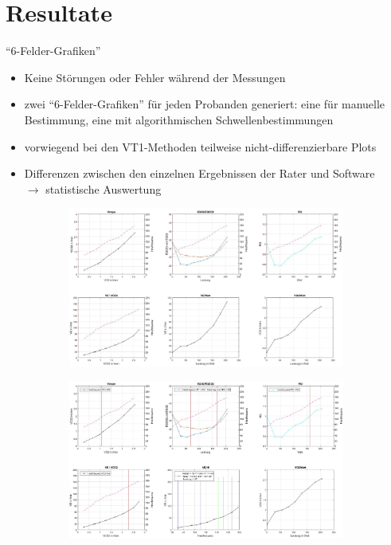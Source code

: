 \documentclass[colorBG,slideColor,8pt]{beamer}
\begin{document}
\section{Resultate}

\begin{frame}{"`6-Felder-Grafiken"'}
	\begin{itemize}
		\item Keine Störungen oder Fehler während der Messungen
		\item zwei "`6-Felder-Grafiken"' für jeden Probanden generiert: eine für manuelle Bestimmung, eine mit algorithmischen Schwellenbestimmungen
		\item vorwiegend bei den VT1-Methoden teilweise nicht-differenzierbare Plots
		\item Differenzen zwischen den einzelnen Ergebnissen der Rater und Software\\$\rightarrow$ statistische Auswertung
	\end{itemize}
	\begin{figure}[H]
		\begin{subfigure}[c]{0.45\linewidth}
			\centering
			\includegraphics[width=\linewidth]{Bilder/plot_6w.jpg}
		\end{subfigure}
		\hfil
		\begin{subfigure}[c]{0.45\linewidth}
			\centering
			\includegraphics[width=\linewidth]{Bilder/auto_6.png}
		\end{subfigure}
	\end{figure}
\end{frame}
\end{document}
